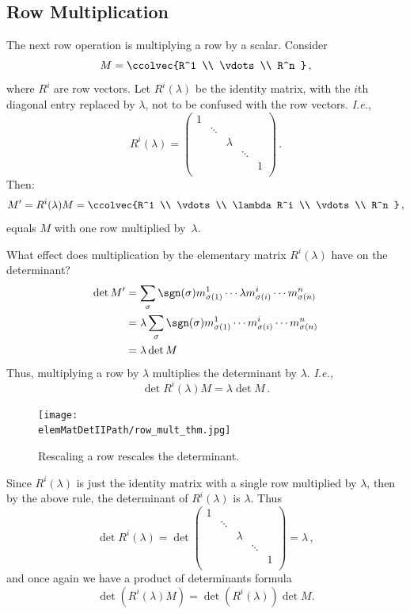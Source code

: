 \subsection{Row  Multiplication}
The next row operation is multiplying a row by a scalar.
Consider \[M=\ccolvec{R^1 \\ \vdots \\ R^n }\, ,\] where $R^i$ are row vectors.  Let $R^i(\lambda)$ be the identity matrix, with the $i$th diagonal entry replaced by $\lambda$, not to be confused with the row vectors. {\itshape I.e.},
\[
R^i(\lambda)=
\begin{pmatrix}
1 & & & & \\
  & \ddots & & & \\
  & & \lambda & & \\
  & & & \ddots & \\
  & & & & 1 \\
\end{pmatrix}
\, .\]
Then:
\[
M'=R^i(\lambda)M=\ccolvec{R^1 \\ \vdots \\ \lambda R^i \\ \vdots \\ R^n }\, ,
\]
equals $M$ with one row multiplied by~$\lambda$.

What effect does multiplication by the elementary matrix $R^i(\lambda)$ have on the determinant?
\begin{align*}
\det M' & = \sum_{\sigma} \sgn (\sigma) m^1_{\sigma(1)}\cdots \lambda m^i_{\sigma(i)} \cdots m^n_{\sigma(n)} \\
& = \lambda \sum_{\sigma} \sgn (\sigma) m^1_{\sigma(1)}\cdots m^i_{\sigma(i)} \cdots m^n_{\sigma(n)} \\
& = \lambda \det M
\end{align*}
Thus, multiplying a row by $\lambda$ multiplies the determinant by $\lambda$.
{\itshape I.e.,} \[\det R^i(\lambda) M = \lambda \det M\, .\]


\begin{figure}
\begin{center}
\texttt{[image: \\elemMatDetIIPath/row\_mult\_thm.jpg]}
\end{center}
\caption{Rescaling a row rescales the determinant.}
\end{figure}


Since $R^i(\lambda)$ is just the identity matrix with a single row multiplied by $\lambda$, then by the above rule, the determinant of $R^i(\lambda)$ is $\lambda$.  Thus
\[
\det R^i(\lambda) = \det \begin{pmatrix}
1 & & & & \\
  & \ddots & & & \\
  & & \lambda & & \\
  & & & \ddots & \\
  & & & & 1 \\
\end{pmatrix} = \lambda\, ,
\]
and once again we have a product of determinants formula
\[
\det \left( R^i(\lambda) M \right) = \det\left( R^i(\lambda) \right)\det M.
\]

